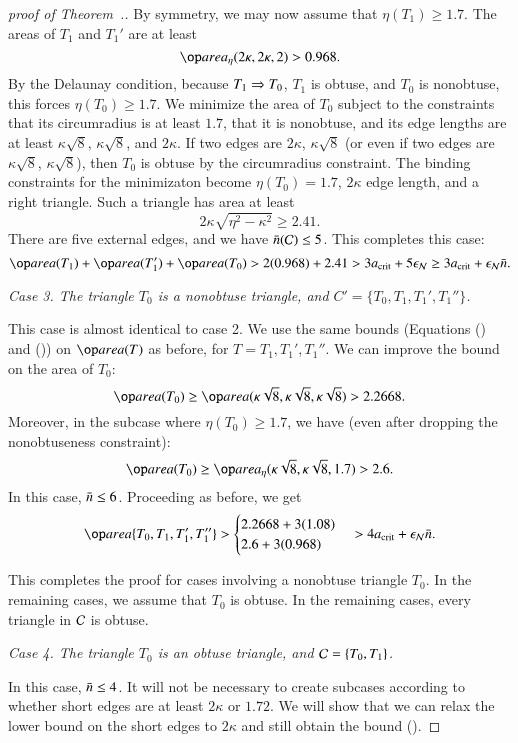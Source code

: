 \begin{proof}[proof of Theorem~.]
By symmetry, we may now assume that $\eta(T_1) \ge 1.7$.  
The areas of $T_1$ and $T_1'$ are at least
\begin{equation}\libel{eqn:968}
\areta(2\kappa,2\kappa,2) > 0.968.
\end{equation}
By the Delaunay condition, because $T_1\Rightarrow T_0$, $T_1$ is obtuse, and
$T_0$ is nonobtuse, this forces $\eta(T_0)\ge 1.7$.  We minimize the
area of $T_0$ subject to the constraints that its circumradius is at
least $1.7$, that it is nonobtuse, and its edge lengths are at least
$\kappa\sqrt{8}$, $\kappa\sqrt{8}$, and $2\kappa$.  If two edges are
$2\kappa$, $\kappa\sqrt{8}$ (or even if two edges are $\kappa\sqrt8$,
$\kappa\sqrt8$), then $T_0$ is obtuse by the circumradius constraint.
The binding constraints for the minimizaton become $\eta(T_0)=1.7$,
$2\kappa$ edge length, and a right triangle.  Such a triangle has area
at least
\[
2\kappa\sqrt{\eta^2 - \kappa^2} \ge 2.41.
\]  
There are five external edges, and we have $\bar n(\mathcal C)\le 5$.
This completes this case:
\[
\area(T_1) + \area(T_1') + \area(T_0) 
>
2(0.968) + 2.41 > 3\acrit + 5 \epsN \ge 3\acrit + \epsN \tn.
\] 

{\it Case 3. The triangle $T_0$ is a nonobtuse triangle, and
  $C'=\{T_0,T_1,T_1',T_1''\}$.}

This case is almost identical to case 2.  We use the same bounds
(Equations () and ()) on $\area(T)$ as
before, for $T = T_1, T_1', T_1''$.  We can improve the bound on the
area of $T_0$:
\[
\area(T_0) 
\ge \area(\kappa\sqrt{8},\kappa\sqrt{8},\kappa\sqrt{8}) > 2.2668.
\]
Moreover, in the subcase where $\eta(T_0)\ge 1.7$, we have
(even after dropping the nonobtuseness constraint):
\[
\area(T_0) \ge \areta(\kappa\sqrt{8},\kappa\sqrt{8},1.7) > 2.6.
\]
In this case, $\bar n\le 6$.  Proceeding as before, we get
\[
\area\{T_0,T_1,T_1',T_1''\} > 
\begin{cases}
2.2668 + 3 (1.08) \\
2.6 + 3(0.968)
\end{cases}
> 4\acrit +  \epsN \tn.
\] 


This completes the proof for cases involving a nonobtuse triangle
$T_0$.  In the remaining cases, we assume that $T_0$ is obtuse.  
In the remaining cases, every triangle in $\mathcal C$ is obtuse.

{\it Case 4. The triangle $T_0$ is an obtuse triangle, and
  $\mathcal C=\{T_0,T_1\}$.}

In this case, $\bar n\le 4$.  It will not be necessary to create subcases
according to whether short edges are at least $2\kappa$ or $1.72$.  We
will show that we can relax the lower bound on the short edges to
$2\kappa$ and still obtain the bound ().


\end{proof}

